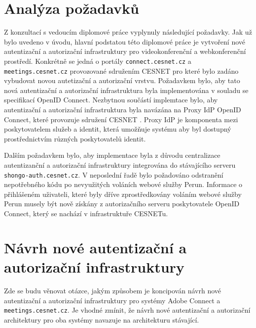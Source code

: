 \documentclass[
  printed, %
  twoside, %
  table,   %
  nolof,     %
  nolot,     %
]{fithesis3}
\begin{document}
\section{Analýza požadavků}
Z konzultací s vedoucím diplomové práce vyplynuly následující požadavky. Jak už bylo uvedeno v úvodu, hlavní podstatou této diplomové práce je vytvoření nové autentizační a autorizační infrastruktury pro videokonferenční a webkonferenční prostředí. Konkrétně se jedná o portály \texttt{connect.cesnet.cz} a \texttt{meetings.cesnet.cz} provozované sdružením CESNET pro které bylo zadáno vybudovat novou autetizační a autorizační vrstvu. Požadavkem bylo, aby tato nová autentizační a autorizační infrastruktura byla implementována v souladu se specifikací OpenID Connect. Nezbytnou součástí implemtace bylo, aby autentizační a autorizační infrastruktura byla navázána na Proxy IdP OpenID Connect, které provozuje sdružení CESNET \cite{proxyIdpPresentation}. Proxy IdP je komponenta mezi poskytovatelem služeb a identit, která umožňuje systému aby byl dostupný prostřednictvím různých poskytovatelů identit. \par

Dalším požadavkem bylo, aby implementace byla z důvodu centralizace autentizanční a autorizační infrastruktury integrována do stávajícího serveru \texttt{shongo-auth.cesnet.cz}. V neposlední řadě bylo požadováno odstranění nepotřebného kódu po nevyužitých voláních webové služby Perun. Informace o přihlášeném uživateli, které byly dříve zprostředkovány voláním webové služby Perun musely být nově získány z autorizačního serveru poskytovatele OpenID Connect, který se nachází v infrastruktuře CESNETu.     


\section{Návrh nové autentizační a autorizační infrastruktury}
Zde se budu věnovat otázce, jakým způsobem je koncipován návrh nové autentizační a autorizační infrastruktury pro systémy Adobe Connect a \texttt{meetings.cesnet.cz}. Je vhodné zmínit, že návrh nové autentizační a autorizační architektury pro oba systémy navazuje na architekturu stávající. 
\end{document}
